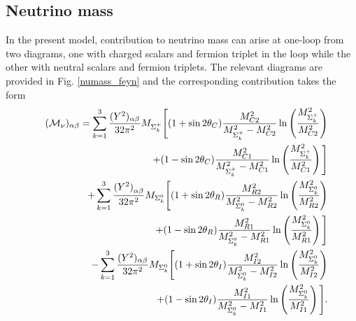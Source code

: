 \documentclass[aps, a4paper,superscriptaddress,12pt,preprintnumbers,floatfix,nofootinbib,amsmath,amssymb]{revtex4}
\begin{document}
\subsection{Neutrino mass}
In the present model, contribution to neutrino mass  can arise at one-loop from two diagrams, one with charged scalars  and fermion triplet in the loop while the other with neutral scalars and fermion triplets. The relevant diagrams are provided in Fig. \ref{numass_feyn} and the corresponding contribution takes the form \cite{Chen:2020ark, Lineros:2020eit, Avila:2019hhv}
\begin{eqnarray}
&&({\cal M}_{\nu})_{\alpha\beta} = \sum_{k=1}^3 \frac{({Y^2})_{\alpha \beta}}{32 \pi^{2}}M_{\Sigma^+_k}
 \Bigg[(1+\sin2\theta_C)\frac{M_{C2}^2}{M_{\Sigma^+_k}^{2}-M_{C2}^2}\ln\left(\frac{M^2_{\Sigma^+_k}}{M^2_{C2}}\right)\nonumber\\
 &&~~~~~~~~~~~~~~~~~~~~~~~~~~~~~~~~+ (1-\sin2\theta_C)\frac{M_{C1}^2}{M_{\Sigma^+_k}^{2} -  M_{C1}^2}\ln\left(\frac{M^2_{\Sigma^+_k}}{M^2_{C1}}\right)  \Bigg]  \nonumber\\
&&~~~~~~~~+\sum_{k=1}^3 \frac{{(Y^2)}_{\alpha \beta}}{32 \pi^{2}} M_{\Sigma^0_k}
 \Bigg[(1+\sin2\theta_R)\frac{M_{R2}^2}{M_{\Sigma^0_k}^{2}-M_{R2}^2}\ln\left(\frac{M^2_{\Sigma^0_k}}{M^2_{R2}}\right) \nonumber\\
 &&~~~~~~~~~~~~~~~~~~~~~~~~~~~~~~~+ (1-\sin2\theta_R)\frac{M_{R1}^2}{M_{\Sigma^0_k}^{2} -  M_{R1}^2}\ln\left(\frac{M^2_{\Sigma^0_k}}{M^2_{R1}}\right)  \Bigg]  \nonumber\\
 &&~~~~~~~~-\sum_{k=1}^3 \frac{{(Y^2})_{\alpha \beta}}{32 \pi^{2}} M_{\Sigma^0_k}
 \Bigg[(1+\sin2\theta_I)\frac{M_{I2}^2}{M_{\Sigma^0_k}^{2}-M_{I2}^2}\ln\left(\frac{M^2_{\Sigma^0_k}}{M^2_{I2}}\right)\nonumber\\
 &&~~~~~~~~~~~~~~~~~~~~~~~~~~~~~~~~+ (1-\sin2\theta_I)\frac{M_{I1}^2}{M_{\Sigma^0_k}^{2} -  M_{I1}^2}\ln\left(\frac{M^2_{\Sigma^0_k}}{M^2_{I1}}\right)  \Bigg].
\label{mass_eqn}
\end{eqnarray}
%
\end{document}
